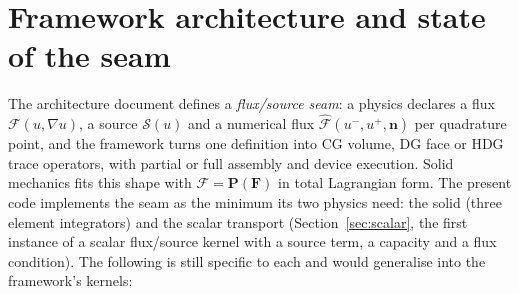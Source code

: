 \documentclass[11pt]{article}
\newcommand{\bn}{\bm{n}}
\newcommand{\bP}{\bm{P}}
\newcommand{\bF}{\bm{F}}
\begin{document}
\section{Framework architecture and state of the seam}
\label{sec:seam}

The architecture document defines a \emph{flux/source seam}: a physics
declares a flux $\bm{\mathcal F}(u, \nabla u)$, a source $\mathcal S(u)$ and
a numerical flux $\hat{\bm{\mathcal F}}(u^-, u^+, \bn)$ per quadrature
point, and the framework turns one definition into CG volume, DG face or
HDG trace operators, with partial or full assembly and device execution.
Solid mechanics fits this shape with $\bm{\mathcal F} = \bP(\bF)$ in total
Lagrangian form.  The present code implements the seam as the minimum its two physics need:
the solid (three element integrators) and the scalar transport
(Section~\ref{sec:scalar}, the first instance of a scalar flux/source
kernel with a source term, a capacity and a flux condition).  The following
is still specific to each and would generalise into the framework's
kernels:
\end{document}
